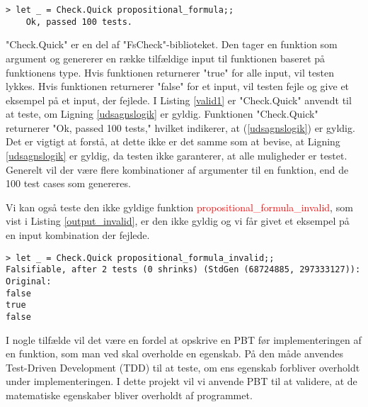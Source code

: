 \begin{lstlisting}[style=output, label={lst:output_example}, caption={Output ved PBT af (\ref{udsagnslogik})}]
    > let _ = Check.Quick propositional_formula;;
    Ok, passed 100 tests.
\end{lstlisting}

"Check.Quick" er en del af "FsCheck"-biblioteket. Den tager en funktion som argument og genererer en række tilfældige input til funktionen baseret på funktionens type. Hvis funktionen returnerer "true" for alle input, vil testen lykkes. Hvis funktionen returnerer "false" for et input, vil testen fejle og give et eksempel på et input, der fejlede. I Listing \ref{valid1} er "Check.Quick" anvendt til at teste, om Ligning \eqref{udsagnslogik} er gyldig. Funktionen "Check.Quick" returnerer "Ok, passed 100 tests," hvilket indikerer, at (\ref{udsagnslogik}) er gyldig. Det er vigtigt at forstå, at dette ikke er det samme som at bevise, at Ligning \eqref{udsagnslogik} er gyldig, da testen ikke garanterer, at alle muligheder er testet. Generelt vil der være flere kombinationer af argumenter til en funktion, end de 100 test cases som genereres.


Vi kan også teste den ikke gyldige funktion \textcolor{red}{propositional\_formula\_invalid}, som vist i Listing \ref{output_invalid}, er den ikke gyldig og vi får givet et eksempel på en input kombination der fejlede.

\begin{lstlisting}[style=output, label={output_invalid}, caption={Output ved PBT af \textcolor{red}{propositional\_formula\_invalid}}]
> let _ = Check.Quick propositional_formula_invalid;;
Falsifiable, after 2 tests (0 shrinks) (StdGen (68724885, 297333127)):
Original:
false
true
false
\end{lstlisting}

I nogle tilfælde vil det være en fordel at opskrive en PBT før implementeringen af en funktion, som man ved skal overholde en egenskab. På den måde anvendes Test-Driven Development (TDD) til at teste, om ens egenskab forbliver overholdt under implementeringen. I dette projekt vil vi anvende PBT til at validere, at de matematiske egenskaber bliver overholdt af programmet.
